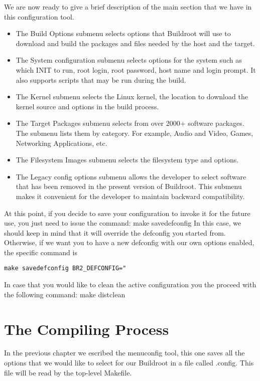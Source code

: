 \documentclass[a4paper,twoside,11pt]{article}
\begin{document}
We are now ready to give a brief description of the main section that we have in this configuration tool.
\begin{itemize}
\item The Build Options submenu selects options that Buildroot will use to download and build the packages and files needed by the host and the target.
\item The System configuration submenu selects options for the system such as which INIT to run, root login, root password, host name and login prompt. It also supports scripts that may be run during the build.
\item The Kernel submenu selects the Linux kernel, the location to download the kernel source and options in the build process.
\item The Target Packages submenu selects from over 2000+ software packages. The submenu lists
them by category. For example, Audio and Video, Games, Networking Applications, etc.
\item The Filesystem Images submenu selects the filesystem type and options.
\item The Legacy config options submenu allows the developer to select software that has been removed in the present version of Buildroot. This submenu makes it convenient for the developer to maintain backward compatibility.
\end{itemize}
At this point, if you decide to save your configuration to invoke it for the future use, you just need to issue the command:
make savedefconfig
In this case, we should keep in mind that it will override the defconfig you started from.
Otherwise, if we want you to have a new defconfig with our own options enabled, the specific command is
\begin{lstlisting}
make savedefconfig BR2_DEFCONFIG="
\end{lstlisting}

In case that you would like to clean the active configuration you the proceed with the following command:
make distclean



\section{The Compiling Process}
In the previous chapter we escribed the menuconfig tool, this one saves all the options that we would like to select for our Buildroot in a file called .config.
This file will be read by the top-level Makefile.
\end{document}

